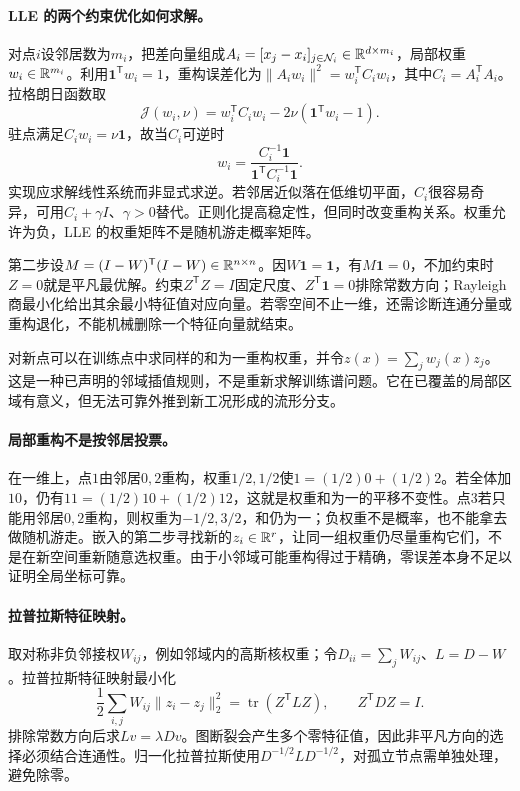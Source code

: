 \paragraph{LLE 的两个约束优化如何求解。}
对点$i$设邻居数为$m_i$，把差向量组成$A_i=[x_j-x_i]_{j\in\mathcal N_i}\in\mathbb{R}^{d\times m_i}$，局部权重$w_i\in\mathbb{R}^{m_i}$。利用$\mathbf1^{\mathsf T}w_i=1$，重构误差化为$\|A_iw_i\|^2=w_i^{\mathsf T}C_iw_i$，其中$C_i=A_i^{\mathsf T}A_i$。拉格朗日函数取
\begin{equation}
 \mathcal J(w_i,\nu)=w_i^{\mathsf T}C_iw_i
 -2\nu(\mathbf1^{\mathsf T}w_i-1).
\end{equation}
驻点满足$C_iw_i=\nu\mathbf1$，故当$C_i$可逆时
\begin{equation}
 w_i=\frac{C_i^{-1}\mathbf1}{\mathbf1^{\mathsf T}C_i^{-1}\mathbf1}.
\end{equation}
实现应求解线性系统而非显式求逆。若邻居近似落在低维切平面，$C_i$很容易奇异，可用$C_i+\gamma I$、$\gamma>0$替代。正则化提高稳定性，但同时改变重构关系。权重允许为负，LLE 的权重矩阵不是随机游走概率矩阵。

第二步设$M=(I-W)^{\mathsf T}(I-W)\in\mathbb{R}^{n\times n}$。因$W\mathbf1=\mathbf1$，有$M\mathbf1=0$，不加约束时$Z=0$就是平凡最优解。约束$Z^{\mathsf T}Z=I$固定尺度、$Z^{\mathsf T}\mathbf1=0$排除常数方向；Rayleigh 商最小化给出其余最小特征值对应向量。若零空间不止一维，还需诊断连通分量或重构退化，不能机械删除一个特征向量就结束。

对新点可以在训练点中求同样的和为一重构权重，并令$z(x)=\sum_jw_j(x)z_j$。这是一种已声明的邻域插值规则，不是重新求解训练谱问题。它在已覆盖的局部区域有意义，但无法可靠外推到新工况形成的流形分支。

\paragraph{局部重构不是按邻居投票。}
在一维上，点$1$由邻居$0,2$重构，权重$1/2,1/2$使$1=(1/2)0+(1/2)2$。若全体加$10$，仍有$11=(1/2)10+(1/2)12$，这就是权重和为一的平移不变性。点$3$若只能用邻居$0,2$重构，则权重为$-1/2,3/2$，和仍为一；负权重不是概率，也不能拿去做随机游走。嵌入的第二步寻找新的$z_i\in\mathbb{R}^r$，让同一组权重仍尽量重构它们，不是在新空间重新随意选权重。由于小邻域可能重构得过于精确，零误差本身不足以证明全局坐标可靠。

\paragraph{拉普拉斯特征映射。}
取对称非负邻接权$W_{ij}$，例如邻域内的高斯核权重；令$D_{ii}=\sum_jW_{ij}$、$L=D-W$。拉普拉斯特征映射最小化\cite{belkin2003laplacian}
\begin{equation}
 \frac12\sum_{i,j}W_{ij}\|z_i-z_j\|_2^2
 =\operatorname{tr}(Z^{\mathsf T}LZ),\qquad Z^{\mathsf T}DZ=I.
\end{equation}
排除常数方向后求$Lv=\lambda Dv$。图断裂会产生多个零特征值，因此非平凡方向的选择必须结合连通性。归一化拉普拉斯使用$D^{-1/2}LD^{-1/2}$，对孤立节点需单独处理，避免除零。

